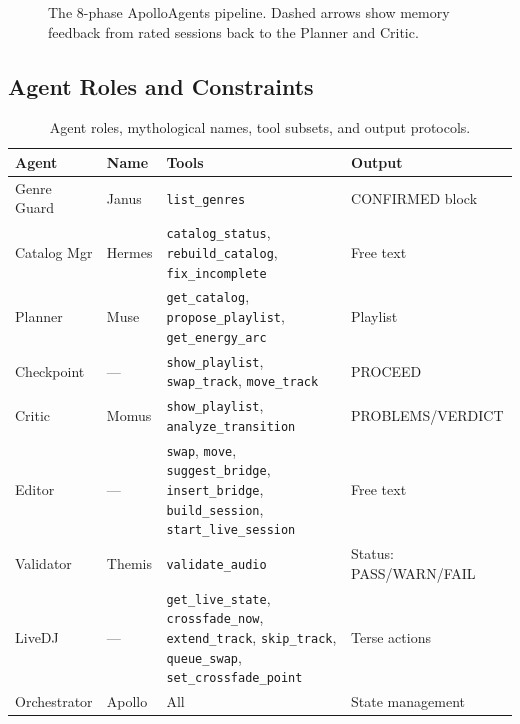 \documentclass[11pt,a4paper]{article}
\begin{document}
\begin{figure}[h]
\caption{The 8-phase ApolloAgents pipeline. Dashed arrows show memory
feedback from rated sessions back to the Planner and Critic.}
\label{fig:pipeline}
\end{figure}

\subsection{Agent Roles and Constraints}

\begin{table}[h]
\centering
\small
\begin{tabularx}{\linewidth}{@{}llXl@{}}
\toprule
\textbf{Agent} & \textbf{Name} & \textbf{Tools} & \textbf{Output} \\
\midrule
Genre Guard   & Janus  & \texttt{list\_genres} & CONFIRMED block \\
Catalog Mgr   & Hermes & \texttt{catalog\_status}, \texttt{rebuild\_catalog}, \texttt{fix\_incomplete} & Free text \\
Planner       & Muse   & \texttt{get\_catalog}, \texttt{propose\_playlist}, \texttt{get\_energy\_arc} & Playlist \\
Checkpoint    & ---    & \texttt{show\_playlist}, \texttt{swap\_track}, \texttt{move\_track} & PROCEED \\
Critic        & Momus  & \texttt{show\_playlist}, \texttt{analyze\_transition} & PROBLEMS/VERDICT \\
Editor        & ---    & \texttt{swap}, \texttt{move}, \texttt{suggest\_bridge}, \texttt{insert\_bridge}, \texttt{build\_session}, \texttt{start\_live\_session} & Free text \\
Validator     & Themis & \texttt{validate\_audio} & Status: PASS/WARN/FAIL \\
LiveDJ        & ---    & \texttt{get\_live\_state}, \texttt{crossfade\_now}, \texttt{extend\_track}, \texttt{skip\_track}, \texttt{queue\_swap}, \texttt{set\_crossfade\_point} & Terse actions \\
Orchestrator  & Apollo & All & State management \\
\bottomrule
\end{tabularx}
\caption{Agent roles, mythological names, tool subsets, and output protocols.}
\label{tab:agents}
\end{table}
\end{document}
